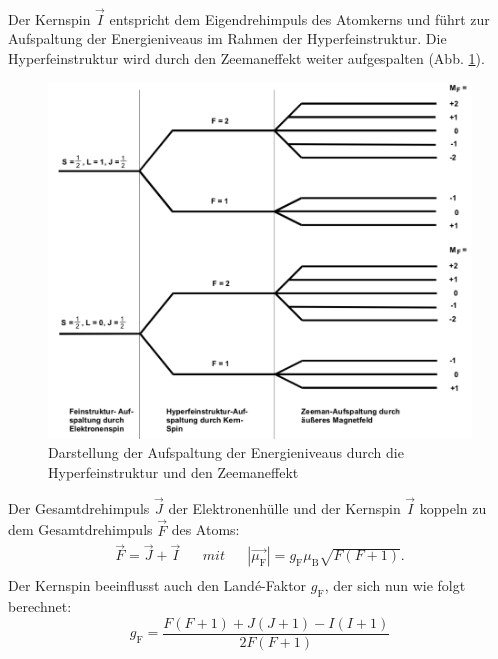 %
%
\\Der Kernspin $\vec{I}$ entspricht dem Eigendrehimpuls des Atomkerns und führt zur Aufspaltung der Energieniveaus im Rahmen der Hyperfeinstruktur.
Die Hyperfeinstruktur wird durch den Zeemaneffekt weiter aufgespalten (Abb. \ref{fig:kernspin}).
\begin{figure}[h!]
  \centering
  \includegraphics[width=\textwidth]{kernspin1.png}
  \caption{Darstellung der Aufspaltung der Energieniveaus durch die Hyperfeinstruktur und den Zeemaneffekt \cite{1}}
  \label{fig:kernspin}
\end{figure}
Der Gesamtdrehimpuls $\vec{J}$ der Elektronenhülle und der Kernspin $\vec{I}$ koppeln zu dem Gesamtdrehimpuls $\vec{F}$ des Atoms:
\begin{align*}
  \vec{F}=\vec{J}+\vec{I} && mit && |\vec{\mu_{\text{F}}}|= g_{\text{F}} \mu_{\text{B}} \sqrt{F(F+1)}.\\
\end{align*}
Der Kernspin beeinflusst auch den Landé-Faktor $g_{\text{F}}$, der sich nun wie folgt berechnet:
\begin{equation}
  g_{\text{F}}= \frac{F(F+1) + J(J+1) - I(I+1)}{2 F(F+1)}
  \label{eqn:landef}
\end{equation}

